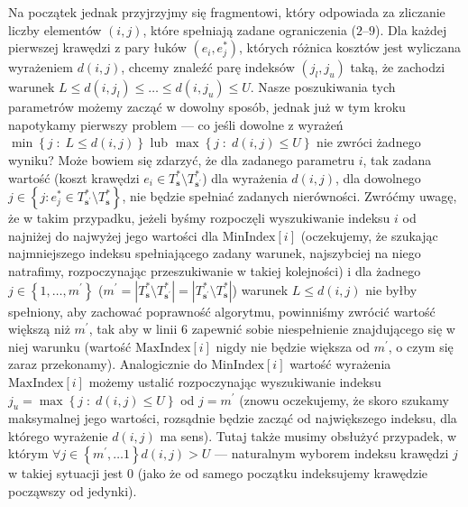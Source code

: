 Na początek jednak przyjrzyjmy się fragmentowi, który odpowiada za zliczanie liczby elementów $\left( i, j \right)$, które spełniają zadane ograniczenia ($2$--$9$). Dla każdej pierwszej krawędzi z pary łuków $\left( e_{i}, e^{\ast}_{j} \right)$, których różnica kosztów jest wyliczana wyrażeniem $d \left( i, j \right)$, chcemy znaleźć parę indeksów $\left( j_{l}, j_{u} \right)$ taką, że zachodzi warunek $L \leqslant d \left( i, j_{l} \right) \leqslant \dots \leqslant d \left( i, j_{u} \right) \leqslant U$. Nasze poszukiwania tych parametrów możemy zacząć w dowolny sposób, jednak już w tym kroku napotykamy pierwszy problem --- co jeśli dowolne z wyrażeń $\min \left\{ j \; : \; L \leqslant d \left( i, j \right) \right\}$ lub $\max \left\{ j \; : \; d \left( i, j \right) \leqslant U \right\}$ nie zwróci żadnego wyniku? Może bowiem się zdarzyć, że dla zadanego parametru $i$, tak zadana wartość (koszt krawędzi $e_{i} \in T^{\ast}_{\textbf{s}} \setminus T^{\ast}_{\textbf{s}^{\prime}}$) dla wyrażenia $d \left( i, j \right)$, dla dowolnego $j \in \left\{ j : e^{\ast}_{j} \in T^{\ast}_{\textbf{s}^{\prime}} \setminus T^{\ast}_{\textbf{s}} \right\}$, nie będzie spełniać zadanych nierówności. Zwróćmy uwagę, że w takim przypadku, jeżeli byśmy rozpoczęli wyszukiwanie indeksu $i$ od najniżej do najwyżej jego wartości dla $\text{MinIndex} \left[ i \right]$ (oczekujemy, że szukając najmniejszego indeksu spełniającego zadany warunek, najszybciej na niego natrafimy, rozpoczynając przeszukiwanie w takiej kolejności) i dla żadnego $j \in \left\{ 1, \dots, m^{\prime} \right\}$ ($m^{\prime} = \left| T^{\ast}_{\textbf{s}} \setminus T^{\ast}_{\textbf{s}^{\prime}} \right| = \left| T^{\ast}_{\textbf{s}^{\prime}} \setminus T^{\ast}_{\textbf{s}} \right|$) warunek $ L \leqslant d \left( i, j \right)$ nie byłby spełniony, aby zachować poprawność algorytmu, powinniśmy zwrócić wartość większą niż $m^{\prime}$, tak aby w linii $6$ zapewnić sobie niespełnienie znajdującego się w niej warunku (wartość $\text{MaxIndex} \left[ i \right]$ nigdy nie będzie większa od $m^{\prime}$, o czym się zaraz przekonamy). Analogicznie do $\text{MinIndex} \left[ i \right]$ wartość wyrażenia $\text{MaxIndex} \left[ i \right]$ możemy ustalić rozpoczynając wyszukiwanie indeksu $j_{u} = \max \left\{ j \; : \; d \left( i, j \right) \leqslant U \right\}$ od $j = m^{\prime}$ (znowu oczekujemy, że skoro szukamy maksymalnej jego wartości, rozsądnie będzie zacząć od największego indeksu, dla którego wyrażenie $d \left( i, j \right)$ ma sens). Tutaj także musimy obsłużyć przypadek, w którym $\forall j \in \left\{ m^{\prime}, \dots 1 \right\} d \left( i, j \right) > U$ --- naturalnym wyborem indeksu krawędzi $j$ w takiej sytuacji jest $0$ (jako że od samego początku indeksujemy krawędzie począwszy od jedynki).

